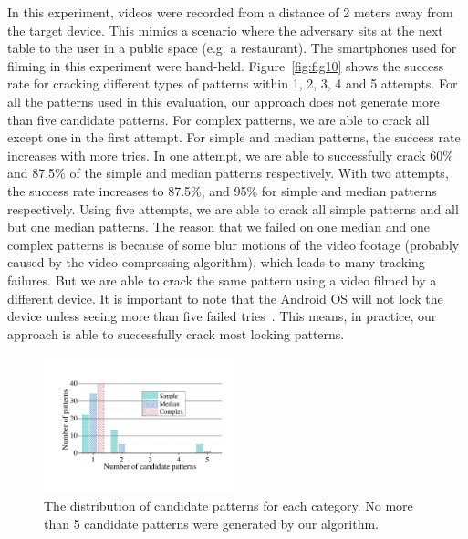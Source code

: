         In this experiment, videos were recorded from a distance of 2 meters away
        from the target device. This mimics a scenario where the adversary sits
        at the next table to the user in a public space (e.g. a restaurant).
        The smartphones used for filming in this experiment were hand-held.
        Figure~\ref{fig:fig10}
        shows the success rate for cracking different types of patterns within 1, 2, 3, 4 and 5 attempts.     For all the patterns used in this evaluation,
        our approach does not generate more than  five candidate patterns.
        For complex patterns, we are able to crack all except one in the first attempt.
        For simple and median patterns, the success rate increases with more tries.
        In one attempt, we are able to
        successfully crack 60\% and 87.5\% of the simple and median patterns respectively. With two attempts, the success rate increases to 87.5\%,
        and 95\% for simple and median patterns
        respectively. Using five attempts, we are able to
        crack all simple patterns and all but one median patterns.
       The reason that we failed on one median and one complex patterns is because of some blur motions of the video footage (probably
       caused by the video compressing algorithm), which leads
       to many tracking failures. But we are able to crack the same
       pattern using a video filmed by a different device.
        It is important to note that the Android OS will not lock the device unless seeing
        more than five failed tries~\cite{egelman2014you}. This means, in practice, our approach is able to
        successfully crack most locking patterns.

\begin{figure}[!t]
    \centering
    \includegraphics[width=0.5\textwidth]{fig/11.pdf}
    \caption{The distribution of candidate patterns for each category. No more than 5 candidate patterns were generated by our algorithm. }
    \label{fig:fig11}
\end{figure}
 

